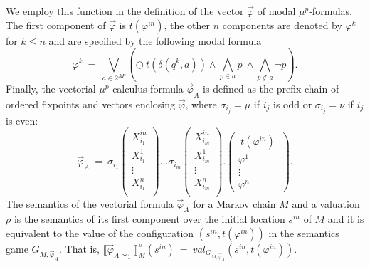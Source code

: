 \documentclass[a4paper,UKenglish]{oasics-v2016}
\begin{document}
We employ this function in the definition of the vector $\vec\varphi$ of modal 
$\mu^p$-formulas.
The first component of $\vec\varphi$ is $t(\varphi^{in})$, the other $n$ 
components are denoted by $\varphi^k$ for $k\leq n$ and are specified by the 
following modal formula
$$\varphi^k\ =\ \bigvee\limits_{a \in 2^{AP}}\left( \bigcirc\ t 
\left(\delta\left(q^k,a\right)\right) \wedge \bigwedge\limits_{p\in a}p\ \wedge 
\bigwedge_{p\notin a} \neg p\right).$$
Finally, the vectorial $\mu^p$-calculus formula $\vec\varphi_A$ is defined as 
the prefix 
chain of ordered fixpoints and vectors enclosing $\vec\varphi$, 
where $\sigma_{i_j}=\mu$ if $i_j$ is odd or $\sigma_{i_j}=\nu$ 
if $i_j$ is even:
$$
\vec{\varphi}_A\ =\ 
\sigma_{i_1} 
\begin{pmatrix}
X^{in}_{i_1}\\[0.3em]
X^{1}_{i_1}\\%
\vdots\\%
X^{n}_{i_1}\\
\end{pmatrix}
\hdots
\sigma_{i_m} 
\begin{pmatrix}
X^{in}_{i_m}\\[0.3em]
X^{1}_{i_m}\\%
\vdots\\%
X^{n}_{i_m}\\
\end{pmatrix}
.
\begin{pmatrix}
\ t\left(\varphi^{in}\right)\ \\[0.3em]
\varphi^1\\%
\vdots\ \\%
\varphi^n
\end{pmatrix}.
$$
The semantics of the vectorial formula $\vec\varphi_A$ for a Markov chain $M$ 
and a valuation $\rho$ is the semantics of its first component over the initial 
location $s^{in}$ of $M$ and it is equivalent to the value of the configuration 
$\left(s^{in}, t\left(\varphi^{in}\right)\right)$ in the semantics game 
$G_{M,\vec\varphi_A}$.
That is, $\llbracket \vec\varphi_A\downarrow_1\rrbracket^\rho_M(s^{in})\ =\ 
val_{G_{M,\vec\varphi_A}}\left(s^{in},t\left(\varphi^{in}\right)\right)$.
\end{document}
